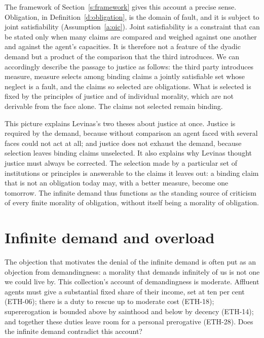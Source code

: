 \documentclass{situationist-preprint}
\begin{document}
The framework of Section~\ref{s:framework} gives this account a precise sense. Obligation, in Definition~\ref{d:obligation}, is the domain of fault, and it is subject to joint satisfiability (Assumption~\ref{a:oic}). Joint satisfiability is a constraint that can be stated only when many claims are compared and weighed against one another and against the agent's capacities. It is therefore not a feature of the dyadic demand but a product of the comparison that the third introduces. We can accordingly describe the passage to justice as follows: the third party introduces measure, measure selects among binding claims a jointly satisfiable set whose neglect is a fault, and the claims so selected are obligations. What is selected is fixed by the principles of justice and of individual morality, which are not derivable from the face alone. The claims not selected remain binding.

This picture explains Levinas's two theses about justice at once. Justice is required by the demand, because without comparison an agent faced with several faces could not act at all; and justice does not exhaust the demand, because selection leaves binding claims unselected. It also explains why Levinas thought justice must always be corrected. The selection made by a particular set of institutions or principles is answerable to the claims it leaves out: a binding claim that is not an obligation today may, with a better measure, become one tomorrow. The infinite demand thus functions as the standing source of criticism of every finite morality of obligation, without itself being a morality of obligation.

\section{Infinite demand and overload}\label{s:overload}

The objection that motivates the denial of the infinite demand is often put as an objection from demandingness: a morality that demands infinitely of us is not one we could live by. This collection's account of demandingness is moderate. Affluent agents must give a substantial fixed share of their income, set at ten per cent (ETH-06); there is a duty to rescue up to moderate cost (ETH-18); supererogation is bounded above by sainthood and below by decency (ETH-14); and together these duties leave room for a personal prerogative (ETH-28). Does the infinite demand contradict this account?
\end{document}
